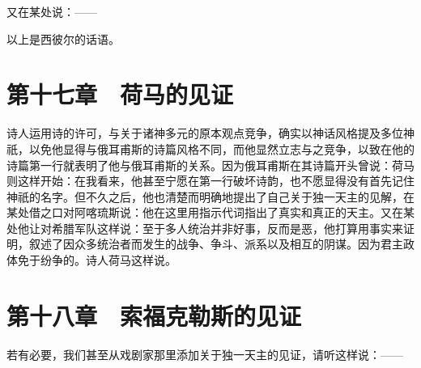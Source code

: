 又在某处说：——\par

\par

以上是西彼尔的话语。\par


\section{第十七章　荷马的见证}

诗人运用诗的许可，与关于诸神多元的原本观点竞争，确实以神话风格提及多位神祇，以免他显得与俄耳甫斯的诗篇风格不同，而他显然立志与之竞争，以致在他的诗篇第一行就表明了他与俄耳甫斯的关系。因为俄耳甫斯在其诗篇开头曾说：荷马则这样开始：在我看来，他甚至宁愿在第一行破坏诗韵，也不愿显得没有首先记住神祇的名字。但不久之后，他也清楚而明确地提出了自己关于独一天主的见解，在某处借之口对阿喀琉斯说：他在这里用指示代词指出了真实和真正的天主。又在某处他让对希腊军队这样说：至于多人统治并非好事，反而是恶，他打算用事实来证明，叙述了因众多统治者而发生的战争、争斗、派系以及相互的阴谋。因为君主政体免于纷争的。诗人荷马这样说。\par


\section{第十八章　索福克勒斯的见证}

若有必要，我们甚至从戏剧家那里添加关于独一天主的见证，请听这样说：——\par


